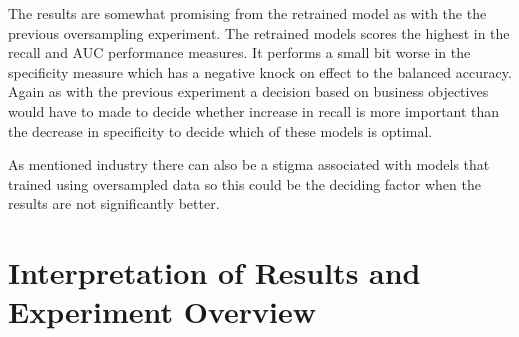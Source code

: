The results are somewhat promising from the retrained model as with the the previous oversampling experiment. The retrained models scores the highest in the recall and AUC performance measures. It performs a small bit worse in the specificity measure which has a negative knock on effect to the balanced accuracy. Again as with the previous experiment a decision based on business objectives would have to made to decide whether increase in recall is more important than the decrease in specificity to decide which of these models is optimal. 

As mentioned industry there can also be a stigma associated with models that trained using oversampled data so this could be the deciding factor when the results are not significantly better.


\section{Interpretation of Results and Experiment Overview}